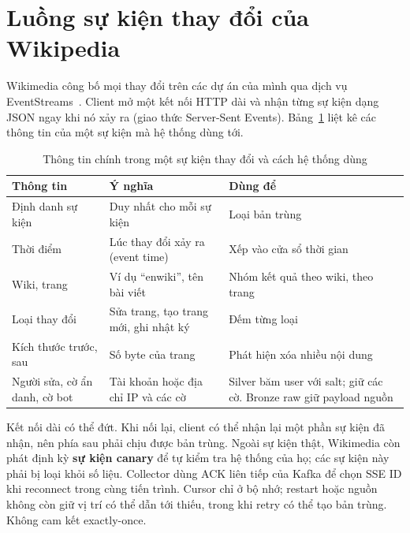 \section{Luồng sự kiện thay đổi của Wikipedia}
Wikimedia công bố mọi thay đổi trên các dự án của mình qua dịch vụ EventStreams~\cite{eventstreams}. Client mở một kết nối
HTTP dài và nhận từng sự kiện dạng JSON ngay khi nó xảy ra (giao thức Server-Sent Events). Bảng~\ref{tab:recentchange} liệt
kê các thông tin của một sự kiện mà hệ thống dùng tới.

\begin{table}[H]
\centering\small
\renewcommand{\arraystretch}{1.18}
\caption{Thông tin chính trong một sự kiện thay đổi và cách hệ thống dùng}\label{tab:recentchange}
\begin{tabularx}{\linewidth}{@{}lXX@{}}
\toprule
\textbf{Thông tin} & \textbf{Ý nghĩa} & \textbf{Dùng để} \\ \midrule
Định danh sự kiện & Duy nhất cho mỗi sự kiện & Loại bản trùng \\
Thời điểm & Lúc thay đổi xảy ra (event time) & Xếp vào cửa sổ thời gian \\
Wiki, trang & Ví dụ \enquote{enwiki}, tên bài viết & Nhóm kết quả theo wiki, theo trang \\
Loại thay đổi & Sửa trang, tạo trang mới, ghi nhật ký & Đếm từng loại \\
Kích thước trước, sau & Số byte của trang & Phát hiện xóa nhiều nội dung \\
Người sửa, cờ ẩn danh, cờ bot & Tài khoản hoặc địa chỉ IP và các cờ & Silver băm user với salt; giữ các cờ. Bronze raw giữ payload nguồn \\
\bottomrule
\end{tabularx}
\end{table}

Kết nối dài có thể đứt. Khi nối lại, client có thể nhận lại một phần sự kiện đã nhận, nên phía sau phải chịu được bản
trùng. Ngoài sự kiện thật, Wikimedia còn phát định kỳ \textbf{sự kiện canary} để tự kiểm tra hệ thống của họ; các sự
kiện này phải bị loại khỏi số liệu.
Collector dùng ACK liên tiếp của Kafka để chọn SSE ID khi reconnect trong cùng tiến trình. Cursor chỉ ở bộ nhớ; restart hoặc nguồn không còn giữ vị trí có thể dẫn tới thiếu, trong khi retry có thể tạo bản trùng. Không cam kết exactly-once.

